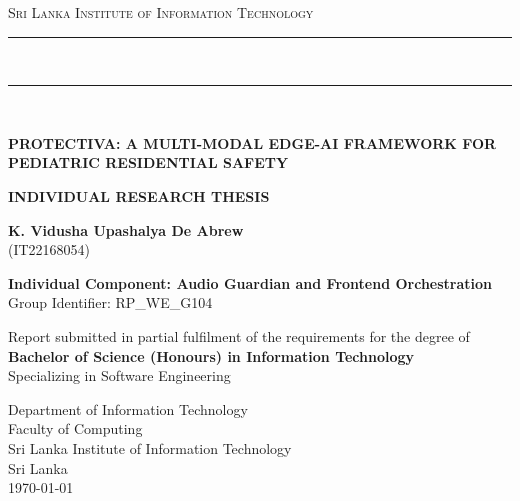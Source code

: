 \documentclass[12pt, a4paper]{report}
\begin{document}
\begin{titlepage}
\begin{center}
{\Large{\textsc{Sri Lanka Institute of Information Technology}}} \\
\vspace{2mm}
\rule[0.1cm]{15.8cm}{0.1mm} \\
\vspace{-5mm}
\rule[0.5cm]{15.8cm}{0.6mm} \\
\vspace{1.5cm}

{\LARGE \textbf{PROTECTIVA: A MULTI-MODAL EDGE-AI FRAMEWORK FOR PEDIATRIC RESIDENTIAL SAFETY}} \\
\vspace{1.2cm}

{\Large \textbf{INDIVIDUAL RESEARCH THESIS}} \\
\vspace{1cm}

{\large \textbf{K. Vidusha Upashalya De Abrew}} \\
{\large (IT22168054)} \\
\vspace{1cm}

{\large \textbf{Individual Component: Audio Guardian and Frontend Orchestration}} \\
{\large Group Identifier: RP\_WE\_G104} \\
\vspace{1.5cm}

{\large Report submitted in partial fulfilment of the requirements for the degree of} \\
{\large \textbf{Bachelor of Science (Honours) in Information Technology}} \\
{\large Specializing in Software Engineering} \\
\vspace{1.5cm}

{\large Department of Information Technology} \\
{\large Faculty of Computing} \\
{\large Sri Lanka Institute of Information Technology} \\
{\large Sri Lanka} \\
\vfill
{\large \today}
\end{center}
\end{titlepage}

\setcounter{page}{2}
\end{document}
